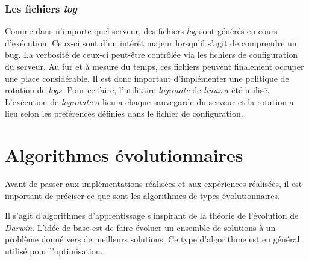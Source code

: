 \documentclass[a4paper, 11pt]{report}
\begin{document}
\subsubsection{Les fichiers \textit{log}}
Comme dans n'importe quel serveur, des fichiers \textit{log} sont générés en cours d'exécution. Ceux-ci sont d'un intérêt majeur lorsqu'il s'agit de comprendre un bug. La verbosité de ceux-ci peut-être contrôlée via les fichiers de configuration du serveur. Au fur et à mesure du temps, ces fichiers peuvent finalement occuper une place considérable. Il est donc important d'implémenter une politique de rotation de \textit{logs}. Pour ce faire, l'utilitaire \textit{logrotate} de \textit{linux} a été utilisé. L'exécution de \textit{logrotate} a lieu a chaque sauvegarde du serveur et la rotation a lieu selon les préférences définies dans le fichier de configuration. %



\section{Algorithmes évolutionnaires}
Avant de passer aux implémentations réalisées et aux expériences réalisées, il est important de préciser ce que sont les algorithmes de types évolutionnaires. 

Il s'agit d'algorithmes d'apprentissage s'inspirant de la théorie de l'évolution de \textit{Darwin}. L'idée de base est de faire évoluer un ensemble de solutions à un problème donné vers de meilleurs solutions. Ce type d'algorithme est en général utilisé pour l'optimisation.
\end{document}
